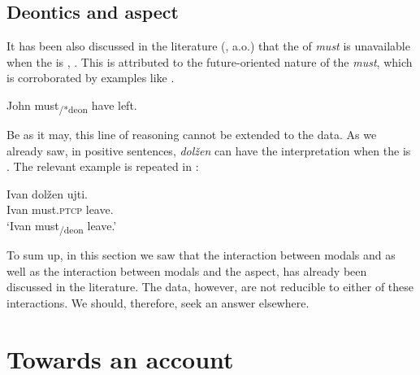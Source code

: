 \documentclass[output=paper,newtxmath,colorlinks,citecolor=brown]{langsci/langscibook}
\begin{document}
\ea \label{rusmust} 
			\z \z

\subsection{Deontics and aspect}\label{subsect:deonaspect}
It has been also discussed in the literature (\citealt{han99,nin05,hel16}, a.o.) that the  of \textit{must} is unavailable when the  is , . This is attributed to the future-oriented nature of the  \textit{must}, which is corroborated by examples like .

	\ea John must\textsubscript{/*deon} have left.\label{deonasp}
    \z
    \ea \label{deonfut} 
	\z \z

\noindent Be as it may, this line of reasoning cannot be extended to the  data. As we already saw, in positive sentences, \textit{dolžen} can have the  interpretation when the  is . The relevant example is repeated in :

\ea \gll Ivan dolžen ujti.\\
		Ivan must.\textsc{ptcp} {leave.\p} \\
        \glt `Ivan must\textsubscript{/deon} leave.' \label{deonasprus}
        \z

\noindent To sum up, in this section we saw that the interaction between  modals and  as well as the interaction between  modals and the  aspect, has already been discussed in the literature. The  data, however,  are not reducible to either of these interactions. We should, therefore, seek an answer elsewhere.

\section{Towards an account}\label{sect:proposal}
\end{document}
